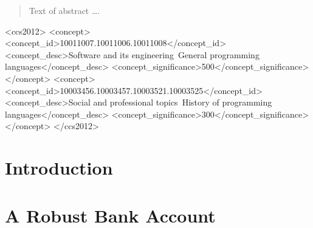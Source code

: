 \documentclass[acmsmall,review,anonymous]{acmart}\settopmatter{printfolios=true,printccs=false,printacmref=false}
\begin{document}
\begin{abstract}
Text of abstract \ldots.
\end{abstract}


\begin{CCSXML}
<ccs2012>
<concept>
<concept_id>10011007.10011006.10011008</concept_id>
<concept_desc>Software and its engineering~General programming languages</concept_desc>
<concept_significance>500</concept_significance>
</concept>
<concept>
<concept_id>10003456.10003457.10003521.10003525</concept_id>
<concept_desc>Social and professional topics~History of programming languages</concept_desc>
<concept_significance>300</concept_significance>
</concept>
</ccs2012>
\end{CCSXML}





\maketitle

\section{Introduction}

\section{A Robust Bank Account}
\end{document}
